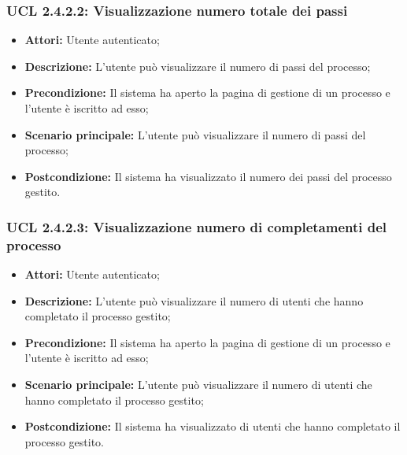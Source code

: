 \hypertarget{L2.4.2.2}{}
\subsubsection{UCL 2.4.2.2: Visualizzazione numero totale dei passi}
\begin{itemize}
\item \textbf{Attori:} Utente autenticato;
\item \textbf{Descrizione:} L'utente può visualizzare il numero di passi del processo;
\item \textbf{Precondizione:} Il sistema ha aperto la pagina di gestione di un processo e l'utente è iscritto ad esso;
\item \textbf{Scenario principale:} L'utente può visualizzare il numero di passi del processo;
\item \textbf{Postcondizione:} Il sistema ha visualizzato il numero dei passi del processo gestito.
\end{itemize}

\hypertarget{L2.4.2.3}{}
\subsubsection{UCL 2.4.2.3: Visualizzazione numero di completamenti del processo}
\begin{itemize}
\item \textbf{Attori:} Utente autenticato;
\item \textbf{Descrizione:} L'utente può visualizzare il numero di utenti che hanno completato il processo gestito;
\item \textbf{Precondizione:} Il sistema ha aperto la pagina di gestione di un processo e l'utente è iscritto ad esso;
\item \textbf{Scenario principale:} L'utente può visualizzare il numero di utenti che hanno completato il processo gestito;
\item \textbf{Postcondizione:} Il sistema ha visualizzato di utenti che hanno completato il processo gestito.
\end{itemize}

